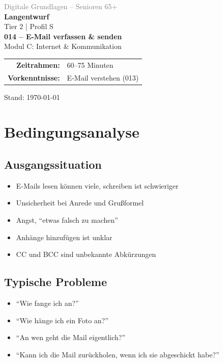 \documentclass[11pt,a4paper]{article}
\begin{document}
\begin{titlepage}
    \centering
    \vspace*{2cm}
    {\Large\textcolor{gray}{Digitale Grundlagen -- Senioren 65+}}\\[2cm]
    {\Huge\textcolor{fach}{\textbf{Langentwurf}}}\\[0.5cm]
    {\large Tier 2 | Profil S}\\[2cm]
    {\LARGE\textbf{014 -- E-Mail verfassen \& senden}}\\[0.5cm]
    {\large Modul C: Internet \& Kommunikation}\\[2cm]
    \begin{tabular}{rl}
        \textbf{Zeitrahmen:} & 60--75 Minuten \\
        \textbf{Vorkenntnisse:} & E-Mail verstehen (013) \\
    \end{tabular}
    \vfill
    {\normalsize Stand: \today}
\end{titlepage}

\tableofcontents
\newpage

\section{Bedingungsanalyse}

\subsection{Ausgangssituation}
\begin{itemize}
    \item E-Mails lesen können viele, schreiben ist schwieriger
    \item Unsicherheit bei Anrede und Grußformel
    \item Angst, ``etwas falsch zu machen''
    \item Anhänge hinzufügen ist unklar
    \item CC und BCC sind unbekannte Abkürzungen
\end{itemize}

\subsection{Typische Probleme}
\begin{itemize}
    \item ``Wie fange ich an?''
    \item ``Wie hänge ich ein Foto an?''
    \item ``An wen geht die Mail eigentlich?''
    \item ``Kann ich die Mail zurückholen, wenn ich sie abgeschickt habe?''
\end{itemize}
\end{document}
